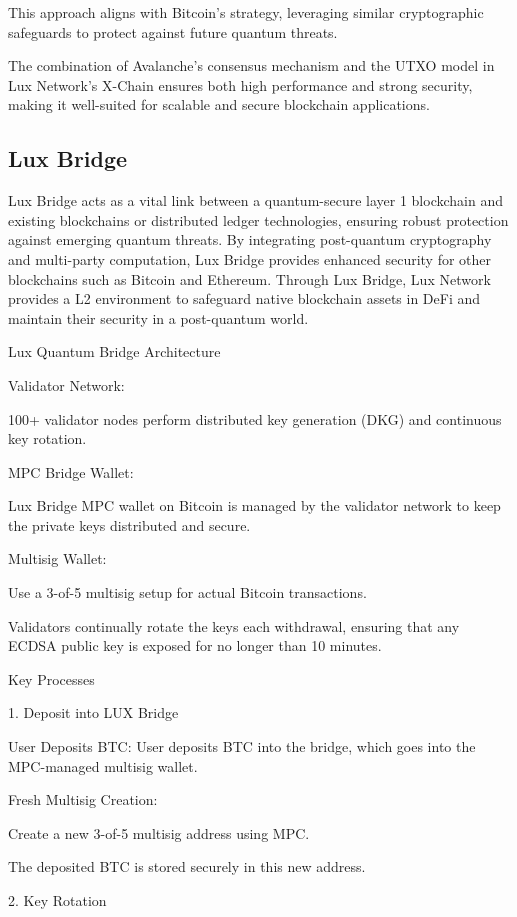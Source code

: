 \documentclass[11pt]{article}
\begin{document}
This approach aligns with Bitcoin's strategy, leveraging similar cryptographic safeguards to protect against future quantum threats.


The combination of Avalanche's consensus mechanism and the UTXO model in Lux Network's X-Chain ensures both high performance and strong security, making it well-suited for scalable and secure blockchain applications.


\subsection{Lux Bridge}

Lux Bridge acts as a vital link between a quantum-secure layer 1 blockchain and existing blockchains or distributed ledger technologies, ensuring robust protection against emerging quantum threats. By integrating post-quantum cryptography and multi-party computation, Lux Bridge provides enhanced security for other blockchains such as Bitcoin and Ethereum. Through Lux Bridge, Lux Network provides a L2 environment to safeguard native blockchain assets in DeFi and maintain their security in a post-quantum world.


Lux Quantum Bridge Architecture


Validator Network:


100+ validator nodes perform distributed key generation (DKG) and continuous key rotation.


MPC Bridge Wallet:


Lux Bridge MPC wallet on Bitcoin is managed by the validator network to keep the private keys distributed and secure.


Multisig Wallet:


Use a 3-of-5 multisig setup for actual Bitcoin transactions.


Validators continually rotate the keys each withdrawal, ensuring that any ECDSA public key is exposed for no longer than 10 minutes.


Key Processes


1.⁠ ⁠Deposit into LUX Bridge


User Deposits BTC: User deposits BTC into the bridge, which goes into the MPC-managed multisig wallet.


Fresh Multisig Creation:


Create a new 3-of-5 multisig address using MPC.


The deposited BTC is stored securely in this new address.


2.⁠ ⁠Key Rotation
\end{document}
